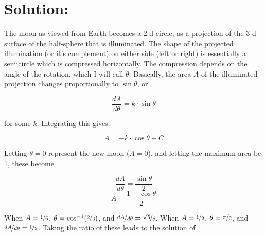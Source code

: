 \documentclass{article}
\begin{document}
\section*{Solution:}

The moon as viewed from Earth becomes a 2-d circle, as a projection of the 3-d surface of the half-sphere that is illuminated.
The shape of the projected illumination (or it's complement) on either side (left or right) is essentially a semicircle which is compressed horizontally.
The compression depends on the angle of the rotation, which I will call $\theta$.
Basically, the area $A$ of the illuminated projection changes proportionally to $\sin\theta$, or

\[
\frac{dA}{d\theta}=k\cdot\sin\theta
\]

for some $k$.
Integrating this gives:

\[
A=-k\cdot\cos\theta+C
\]

Letting $\theta=0$ represent the new moon ($A=0$), and letting the maximum area be 1, these become

\[
\frac{dA}{d\theta}=\frac{\sin\theta}{2}
\]
\[
A=\frac{1-\cos\theta}{2}
\]

When $A=\nicefrac{1}{6}$, $\theta=\cos^{-1}(\nicefrac{2}{3})$, and $\nicefrac{dA}{d\theta}=\nicefrac{\sqrt{5}}{6}$.
When $A=\nicefrac{1}{2}$, $\theta=\nicefrac{\pi}{2}$, and $\nicefrac{dA}{d\theta}=\nicefrac{1}{2}$.
Taking the ratio of these leads to the solution of
\,.
\end{document}
